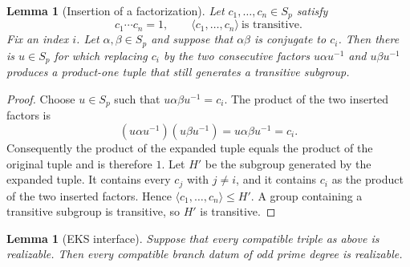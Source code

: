 \documentclass[11pt]{amsart}
\theoremstyle{plain}
\newtheorem{lemma}[theorem]{Lemma}
\theoremstyle{definition}
\numberwithin{equation}{section}
\begin{document}
\begin{lemma}[Insertion of a factorization]
\label{lem:factor-insertion}
Let $c_1,\ldots,c_n\in S_p$ satisfy
\[
 c_1\cdots c_n=1,
 \qquad
 \langle c_1,\ldots,c_n\rangle\ \text{is transitive}.
\]
Fix an index $i$.  Let
$\alpha,\beta\in S_p$ and suppose that $\alpha\beta$ is conjugate to $c_i$.
Then there is $u\in S_p$ for which replacing $c_i$ by the two consecutive
factors $u\alpha u^{-1}$ and $u\beta u^{-1}$ produces a product-one tuple
that still generates a transitive subgroup.
\end{lemma}

\begin{proof}
Choose $u\in S_p$ such that $u\alpha\beta u^{-1}=c_i$.  The product of the
two inserted factors is
\[
 (u\alpha u^{-1})(u\beta u^{-1})
   =u\alpha\beta u^{-1}=c_i.
\]
Consequently the product of the expanded tuple equals the product of the
original tuple and is therefore $1$.  Let $H'$ be the subgroup generated by
the expanded tuple.  It contains every $c_j$ with $j\ne i$, and it contains
$c_i$ as the product of the two inserted factors.  Hence
$\langle c_1,\ldots,c_n\rangle\leq H'$.  A group containing a transitive
subgroup is transitive, so $H'$ is transitive.
\end{proof}

\begin{lemma}[EKS interface]\label{lem:EKS}
Suppose that every compatible triple as above is realizable.  Then every
compatible branch datum of odd prime degree is realizable.
\end{lemma}
\end{document}
